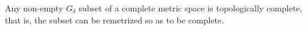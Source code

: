 Any non-empty $G_{\delta}$ subset of a complete metric space is topologically complete, that is, the subset can be remetrized so as to be complete.
